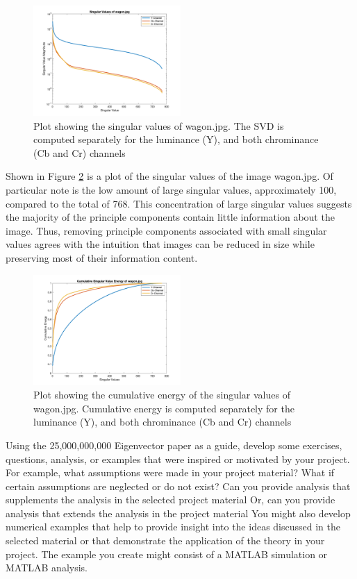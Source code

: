 \documentclass[conference]{IEEEtran}
\begin{document}
    \begin{figure}[t]
    \includegraphics[width=0.5\textwidth]{svals_wagon}
    \caption{Plot showing the singular values of wagon.jpg. The SVD is computed separately for the luminance (Y), and both chrominance (Cb and Cr) channels}
    \label{fig:svalplot}
    \end{figure}
    
    Shown in Figure \ref{fig:svalplot} is a plot of the singular values of the image wagon.jpg. Of particular note is the low amount of large singular values, approximately 100, compared to the total of 768. This concentration of large singular values suggests the majority of the principle components contain little information about the image. Thus, removing principle components associated with small singular values agrees with the intuition that images can be reduced in size while preserving most of their information content. 


    \begin{figure}[t]
    \includegraphics[width=0.5\textwidth]{sv_energy_wagon}
    \caption{Plot showing the cumulative energy of the singular values of wagon.jpg. Cumulative energy is computed separately for the luminance (Y), and both chrominance (Cb and Cr) channels}
    \label{fig:svalplot}
    \end{figure}
    
    Using the 25,000,000,000 Eigenvector paper as a guide, develop some exercises, questions, analysis, or examples that were inspired or motivated by your project. For example, what assumptions were made in your project material? What if certain assumptions are neglected or do not exist? Can you provide analysis that supplements the analysis in the selected project material Or, can you provide analysis that extends the analysis in the project material You might also develop numerical examples that help to provide insight into the ideas discussed in the selected material or that demonstrate the application of the theory in your project. The example you create might consist of a MATLAB simulation or MATLAB analysis.
\end{document}
